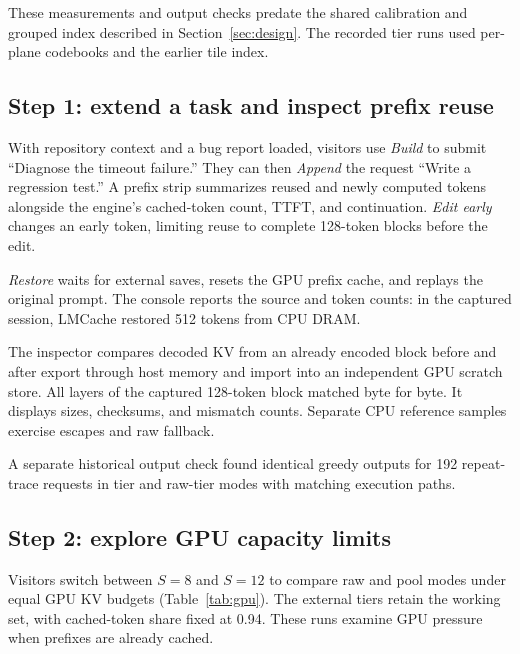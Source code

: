 \documentclass[conference]{IEEEtran}
\begin{document}
These measurements and output checks predate the shared calibration and
grouped index described in Section~\ref{sec:design}. The recorded tier runs
used per-plane codebooks and the earlier tile index.

\subsection{Step 1: extend a task and inspect prefix reuse}
With repository context and a bug report loaded, visitors use \emph{Build}
to submit ``Diagnose the timeout failure.'' They can then \emph{Append} the
request ``Write a regression test.'' A prefix strip summarizes reused and newly
computed tokens alongside the engine's cached-token count, TTFT, and
continuation. \emph{Edit early} changes an early token, limiting reuse to
complete 128-token blocks before the edit.

\emph{Restore} waits for external saves, resets the GPU prefix cache, and
replays the original prompt. The console reports the source and token
counts: in the captured session, LMCache restored 512 tokens from CPU DRAM.

The inspector compares decoded KV from an already encoded block before
and after export through host memory and import into an independent GPU
scratch store. All layers of the captured 128-token block matched byte for
byte. It displays sizes, checksums, and mismatch counts. Separate CPU
reference samples exercise escapes and raw fallback.

A separate historical output check found identical greedy outputs for
192 repeat-trace requests in tier and raw-tier modes with matching execution
paths.

\subsection{Step 2: explore GPU capacity limits}
Visitors switch between $S=8$ and $S=12$ to compare raw and pool modes
under equal GPU KV budgets (Table~\ref{tab:gpu}). The external tiers retain
the working set, with cached-token share fixed at 0.94. These runs examine
GPU pressure when prefixes are already cached.
\end{document}
